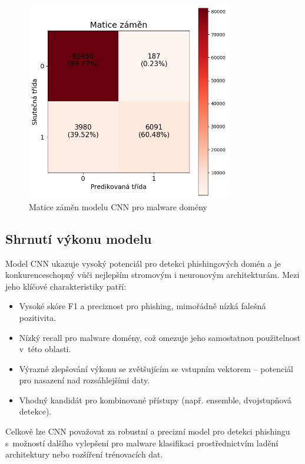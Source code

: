 \begin{figure}[H]
    \centering
    \includegraphics[width=0.8\textwidth]{obrazky-figures/cnn_stage_3_malware_v1.1_confusion_matrix.png}
    \caption{Matice záměn modelu CNN pro malware domény}
    \label{fig:cnn_conf_matrix_malware}
\end{figure}

\subsection{Shrnutí výkonu modelu}

Model CNN ukazuje vysoký potenciál pro detekci phishingových domén a je konkurenceschopný vůči nejlepším stromovým i neuronovým architekturám. Mezi jeho klíčové charakteristiky patří:

\begin{itemize}
    \item Vysoké skóre F1 a preciznost pro phishing, mimořádně nízká falešná pozitivita.
    \item Nízký recall pro malware domény, což omezuje jeho samostatnou použitelnost v~této oblasti.
    \item Výrazné zlepšování výkonu se zvětšujícím se vstupním vektorem – potenciál pro nasazení nad rozsáhlejšími daty.
    \item Vhodný kandidát pro kombinované přístupy (např. ensemble, dvojstupňová detekce).
\end{itemize}

Celkově lze CNN považovat za robustní a precizní model pro detekci phishingu s~možností dalšího vylepšení pro malware klasifikaci prostřednictvím ladění architektury nebo rozšíření trénovacích dat.










